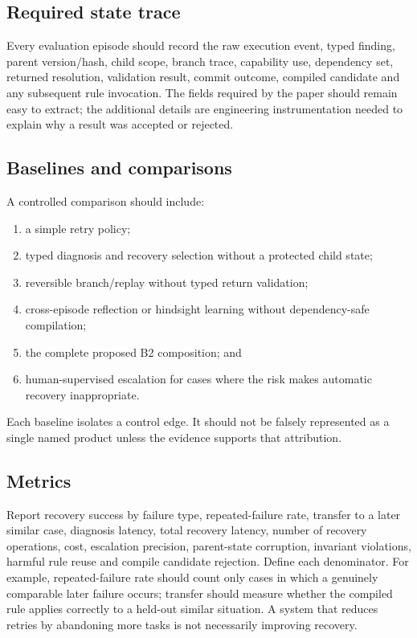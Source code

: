 \subsection{Required state trace}

Every evaluation episode should record the raw execution event, typed finding, parent version/hash, child scope, branch trace, capability use, dependency set, returned resolution, validation result, commit outcome, compiled candidate and any subsequent rule invocation. The fields required by the paper should remain easy to extract; the additional details are engineering instrumentation needed to explain why a result was accepted or rejected.

\subsection{Baselines and comparisons}

A controlled comparison should include:

\begin{enumerate}
  \item a simple retry policy;
  \item typed diagnosis and recovery selection without a protected child state;
  \item reversible branch/replay without typed return validation;
  \item cross-episode reflection or hindsight learning without dependency-safe compilation;
  \item the complete proposed B2 composition; and
  \item human-supervised escalation for cases where the risk makes automatic recovery inappropriate.
\end{enumerate}

Each baseline isolates a control edge. It should not be falsely represented as a single named product unless the evidence supports that attribution.

\subsection{Metrics}

Report recovery success by failure type, repeated-failure rate, transfer to a later similar case, diagnosis latency, total recovery latency, number of recovery operations, cost, escalation precision, parent-state corruption, invariant violations, harmful rule reuse and compile candidate rejection. Define each denominator. For example, repeated-failure rate should count only cases in which a genuinely comparable later failure occurs; transfer should measure whether the compiled rule applies correctly to a held-out similar situation. A system that reduces retries by abandoning more tasks is not necessarily improving recovery.

